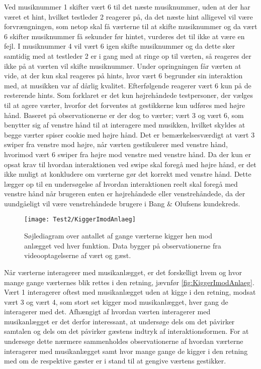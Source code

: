 Ved musiknummer 1 skifter vært 6 til det næste musiknummer, uden at der har været et hint, hvilket testleder 2 reagerer på, da det næste hint alligevel vil være forvrængningen, som netop skal få værterne til at skifte musiknummer og da vært 6 skifter musiknummer få sekunder før hintet, vurderes det til ikke at være en fejl. I musiknummer 4 vil vært 6 igen skifte musiknummer og da dette sker samtidig med at testleder 2 er i gang med at ringe op til værten, så reageres der ikke på at værten vil skifte musiknummer. Under opringningen får værten at vide, at der kun skal reageres på hints, hvor vært 6 begrunder sin interaktion med, at musikken var af dårlig kvalitet. Efterfølgende reagerer vært 6 kun på de resterende hints.\blankline
%
Som forklaret er det kun højrehåndede testpersoner, der vælges til at agere værter, hvorfor det forventes at gestikkerne kun udføres med højre hånd. Baseret på observationerne er der dog to værter; vært 3 og vært 6, som benytter sig af venstre hånd til at interagere med musikken, hvilket skyldes at begge værter spiser cookie med højre hånd. Det er bemærkelsesværdigt at vært 3 swiper fra venstre mod højre, når værten gestikulerer med venstre hånd, hvorimod vært 6 swiper fra højre mod venstre med venstre hånd. Da der kun er opsat krav til hvordan interaktionen ved swipe skal foregå med højre hånd, er det ikke muligt at konkludere om værterne gør det korrekt med venstre hånd. Dette lægger op til en undersøgelse af hvordan interaktionen reelt skal foregå med venstre hånd når brugeren enten er højrehåndede eller venstrehåndede, da der uundgåeligt vil være venstrehåndede brugere i Bang $\&$ Olufsens kundekreds.     
%
\begin{figure}[H]
	\centering
	\texttt{[image: Test2/KiggerImodAnlaeg]}
	\caption{Søjlediagram over antallet af gange værterne kigger hen mod anlægget ved hver funktion. Data bygger på observationerne fra videooptagelserne af vært og gæst.}
	\label{fig:KiggerImodAnlaeg}
\end{figure}
\noindent
% 
Når værterne interagerer med musikanlægget, er det forskelligt hvem og hvor mange gange værternes blik rettes i den retning, jævnfør \autoref{fig:KiggerImodAnlaeg}. Vært 1 interagerer oftest med musikanlægget uden at kigge i den retning, modsat vært 3 og vært 4, som stort set kigger mod musikanlægget, hver gang de interagerer med det. Afhængigt af hvordan værten interagerer med musikanlægget er det derfor interessant, at undersøge dels om det påvirker samtalen og dels om det påvirker gæstens indtryk af interaktionsformen. For at undersøge dette nærmere sammenholdes observationerne af hvordan værterne interagerer med musikanlægget samt hvor mange gange de kigger i den retning med om de respektive gæster er i stand til at gengive værtens gestikker. 

